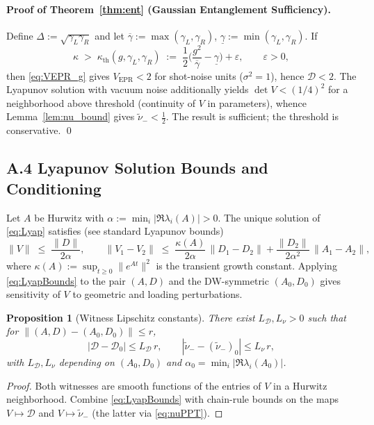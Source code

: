 \documentclass[11pt]{article}
\newtheorem{proposition}{Proposition}
\begin{document}
\paragraph{Proof of Theorem~\ref{thm:ent} (Gaussian Entanglement Sufficiency).}
Define $\Delta:=\sqrt{\gamma_L\gamma_R}$ and let $\overline\gamma:=\max(\gamma_L,\gamma_R)$, $\underline\gamma:=\min(\gamma_L,\gamma_R)$. If
\begin{equation}
\kappa \;>\; \kappa_{\mathrm{th}}(g,\gamma_L,\gamma_R)
\;:=\; \frac{1}{2}\Big( \frac{g^2}{\overline\gamma} - \underline\gamma \Big) + \varepsilon,
\qquad \varepsilon>0,
\label{eq:kappa_th}
\end{equation}
then \eqref{eq:VEPR_g} gives $V_{\mathrm{EPR}}<2$ for shot-noise units ($\sigma^2=1$), hence $\mathcal D<2$. The Lyapunov solution with vacuum noise additionally yields $\det V < (1/4)^2$ for a neighborhood above threshold (continuity of $V$ in parameters), whence Lemma~\ref{lem:nu_bound} gives $\tilde\nu_-<\tfrac12$. The result is sufficient; the threshold is conservative.
\qed

\subsection*{A.4 Lyapunov Solution Bounds and Conditioning}
Let $A$ be Hurwitz with $\alpha:=\min_i |\Re \lambda_i(A)|>0$. The unique solution of \eqref{eq:Lyap} satisfies (see standard Lyapunov bounds)
\begin{equation}
\|V\| \;\le\; \frac{\|D\|}{2\alpha}, 
\qquad
\|V_1 - V_2\| \;\le\; \frac{\kappa(A)}{2\alpha}\,\|D_1-D_2\| + \frac{\|D_2\|}{2\alpha^2}\,\|A_1-A_2\|,
\label{eq:LyapBounds}
\end{equation}
where $\kappa(A):=\sup_{t\ge0}\|e^{At}\|^2$ is the transient growth constant. Applying \eqref{eq:LyapBounds} to the pair $(A, D)$ and the DW-symmetric $(A_0,D_0)$ gives sensitivity of $V$ to geometric and loading perturbations.

\begin{proposition}[Witness Lipschitz constants]
\label{prop:Lipschitz}
There exist $L_{\mathcal D},L_{\nu}>0$ such that for $\|(A,D)-(A_0,D_0)\|\le r$,
\begin{equation}
|\mathcal D - \mathcal D_0| \le L_{\mathcal D}\, r, 
\qquad
|\tilde\nu_- - (\tilde\nu_-)_0| \le L_{\nu}\, r,
\label{eq:wLip}
\end{equation}
with $L_{\mathcal D},L_\nu$ depending on $(A_0,D_0)$ and $\alpha_0=\min_i|\Re\lambda_i(A_0)|$.
\end{proposition}
\begin{proof}
Both witnesses are smooth functions of the entries of $V$ in a Hurwitz neighborhood. Combine \eqref{eq:LyapBounds} with chain-rule bounds on the maps $V\mapsto \mathcal D$ and $V\mapsto \tilde\nu_-$ (the latter via \eqref{eq:nuPPT}).
\end{proof}
\end{document}
